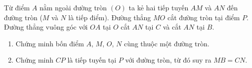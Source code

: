 \begin{bt}%
	Từ điểm $A$ nằm ngoài đường tròn $(O)$ ta kẻ hai tiếp tuyến $AM$ và $AN$ đến đường tròn ($M$ và $N$ là tiếp điểm). Đường thẳng $MO$ cắt đường tròn tại điểm $P$. Đường thẳng vuông góc với $OA$ tại $O$ cắt $AN$ tại $C$ và cắt $AN$ tại $B$.
\begin{enumerate}
	
	\item Chứng minh bốn điểm $A$, $M$, $O$, $N$ cùng thuộc một đường tròn.
	\item Chứng minh $CP$ là tiếp tuyến tại $P$ với đường tròn, từ đó suy ra $MB=CN$. 
\end{enumerate}
\end{bt}
